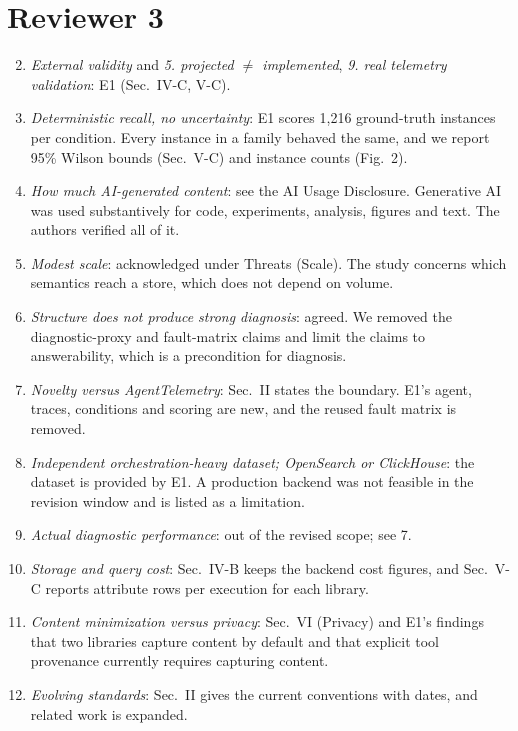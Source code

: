 \documentclass[10pt]{article}
\begin{document}
\section*{Reviewer 3}
\begin{enumerate}[label=\arabic*.]
\setcounter{enumi}{1}
\item \emph{External validity} and \emph{5. projected $\neq$ implemented},
  \emph{9. real telemetry validation}: E1 (Sec.~IV-C, V-C).
\item \emph{Deterministic recall, no uncertainty}: E1 scores 1,216
  ground-truth instances per condition. Every instance in a family behaved the same, and
  we report 95\% Wilson bounds (Sec.~V-C) and instance counts (Fig.~2).
\item \emph{How much AI-generated content}: see the AI Usage Disclosure.
  Generative AI was used substantively for code, experiments, analysis,
  figures and text. The authors verified all of it.
\item \emph{Modest scale}: acknowledged under Threats (Scale). The study
  concerns which semantics reach a store, which does not depend on volume.
\item \emph{Structure does not produce strong diagnosis}: agreed. We
  removed the diagnostic-proxy and fault-matrix claims and limit the
  claims to answerability, which is a precondition for diagnosis.
\item \emph{Novelty versus AgentTelemetry}: Sec.~II states the boundary.
  E1's agent, traces, conditions and scoring are new, and the reused
  fault matrix is removed.
\item[10.] \emph{Independent orchestration-heavy dataset; OpenSearch or
  ClickHouse}: the dataset is provided by E1. A production backend was
  not feasible in the revision window and is listed as a limitation.
\item[11.] \emph{Actual diagnostic performance}: out of the revised scope;
  see 7.
\item[12.] \emph{Storage and query cost}: Sec.~IV-B keeps the backend cost
  figures, and Sec.~V-C reports attribute rows per execution for each
  library.
\item[13.] \emph{Content minimization versus privacy}: Sec.~VI (Privacy) and
  E1's findings that two libraries capture content by default and that
  explicit tool provenance currently requires capturing content.
\item[14.] \emph{Evolving standards}: Sec.~II gives the current conventions
  with dates, and related work is expanded.
\end{enumerate}
\end{document}
